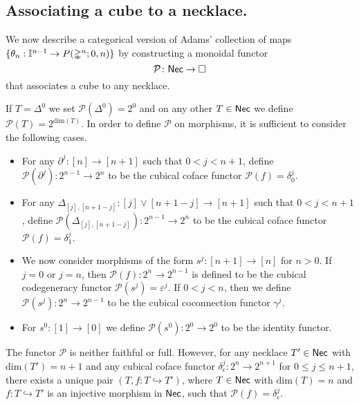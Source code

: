 \subsection{Associating a cube to a necklace.}
We now describe a categorical version of Adams' collection of maps $\{\theta_n: \mathbb{I}^{n-1} \to P(\mathbb{\Delta}^{n};0,n)\}$ by constructing a monoidal functor
$$\mathcal{P} \colon \mathsf{Nec} \to \square$$
that associates a cube to any necklace. 

If $T= \Delta^0$ we set $\mathcal{P}(\Delta^0)=2^0$ and on any other $T \in \mathsf{Nec}$ we define $\mathcal{P}( T )= 2^{\text{dim}(T)}$. In order to define $\mathcal{P}$ on morphisms, it is sufficient to consider the following cases.
\begin{itemize}
\item For any $\partial^j \colon [n] \to [n+1]$ such that $0< j<{n+1}$, define $\mathcal{P}(\partial^j) \colon 2^{n-1}\to 2^{n}$ to be the cubical coface functor $\mathcal{P}(f)= \delta_0^{j}.$ 

\item For any $\Delta_{[j], [n+1-j]} \colon [j] \vee [n+1-j] \to [n+1]$ such that $0<j<n+1$, define $\mathcal{P}(\Delta_{[j], [n+1-j]}) \colon 2^{n-1}\to 2^{n}$ to be the cubical coface functor $\mathcal{P}(f)=\delta_1^{j}$.

\item We now consider morphisms of the form $s^j \colon [n+1] \to [n]$ for $n>0$. If $j=0$ or $j=n$, then $\mathcal{P}(f) \colon 2^n \to 2^{n-1}$ is defined to be the cubical codegeneracy functor $\mathcal{P}(s^j)= \varepsilon^{j}.$ If $0<j<n$, then we define $\mathcal{P}(s^j) \colon 2^n \to 2^{n-1}$ to be the cubical coconnection functor $\gamma^{j}.$

\item For $s^0 \colon [1] \to [0]$ we define $\mathcal{P}(s^0) \colon 2^0 \to 2^0$ to be the identity functor.

\end{itemize}
\begin{remark}
The functor $\mathcal{P}$ is neither faithful or full. However, for any necklace $T' \in \mathsf{Nec}$ with $\text{dim}(T')=n+1$ and any cubical coface functor $\delta_{\epsilon}^j \colon 2^n \to 2^{n+1}$ for $0 \leq j \leq n+1$, there exists a unique pair $(T, f \colon T \hookrightarrow T')$, where $T \in \mathsf{Nec}$ with $\text{dim}(T)=n$ and $f \colon T \hookrightarrow T'$ is an injective morphism in $\mathsf{Nec}$, such that $\mathcal{P}(f)=\delta_{\epsilon}^j $.
\end{remark}

